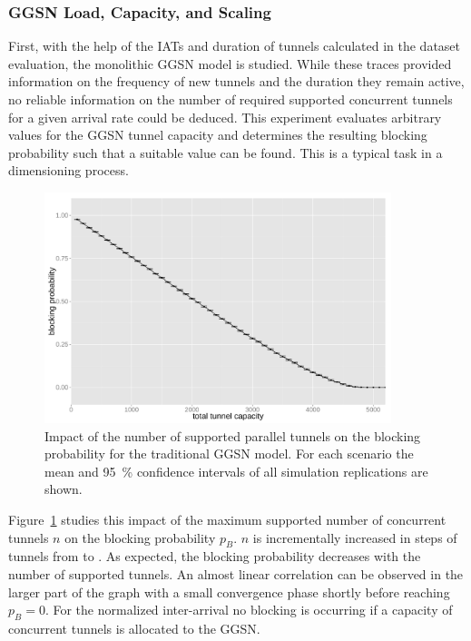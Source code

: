 \subsubsection{GGSN Load, Capacity, and Scaling}

First, with the help of the \glspl{IAT} and duration of tunnels calculated in the dataset evaluation, the monolithic \gls{GGSN} model is studied. While these traces provided information on the frequency of new tunnels and the duration they remain active, no reliable information on the number of required supported concurrent tunnels for a given arrival rate could be deduced. 
This experiment evaluates arbitrary values for the \gls{GGSN} tunnel capacity and determines the resulting blocking probability such that a suitable value can be found. This is a typical task in a dimensioning process.

\begin{figure}[htb]
	\centering
	\includegraphics[width=0.9\textwidth]{images/R-monolithic-blocking.pdf}
	\caption{Impact of the number of supported parallel tunnels on the blocking probability for the traditional \gls{GGSN} model. For each scenario the mean and \SI{95}{\percent} confidence intervals of all simulation replications are shown.}
\label{c4:fig:traditional_blocking}
\end{figure}

Figure~\ref{c4:fig:traditional_blocking} studies this impact of the maximum supported number of concurrent tunnels $n$ on the blocking probability $p_B$. $n$ is incrementally increased in steps of  tunnels from  to . As expected, the blocking probability decreases with the number of supported tunnels. An almost linear correlation can be observed in the larger part of the graph with a small convergence phase shortly before reaching $p_B=0$. For the normalized inter-arrival no blocking is occurring if a capacity of  concurrent tunnels is allocated to the \gls{GGSN}.


